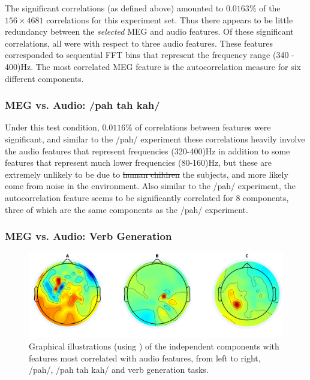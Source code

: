 \documentclass[a4paper]{article}
\begin{document}
The significant correlations (as defined above) amounted to $0.0163$\% of the $156 \times 4681$ correlations for this experiment set. Thus there appears to be little redundancy between the \textit{selected} MEG and audio features. Of these significant correlations, all were with respect to three audio features. These features corresponded to sequential FFT bins that represent the frequency range (340 - 400)Hz. The most correlated MEG feature is the autocorrelation measure for six different components. 

\subsubsection{MEG vs. Audio: /pah tah kah/}

Under this test condition, $0.0116$\% of correlations between features were significant, and similar to the /pah/ experiment these correlations heavily involve the audio features that represent frequencies (320-400)Hz in addition to some features that represent much lower frequencies (80-160)Hz, but these are extremely unlikely to be due to \st{human children} the subjects, and more likely come from noise in the environment. Also similar to the /pah/ experiment, the autocorrelation feature seems to be significantly correlated for 8 components, three of which are the same components as the /pah/ experiment. 


\subsubsection{MEG vs. Audio: Verb Generation}

\begin{figure}[t]
  \centering
  \includegraphics[width=\linewidth]{AllComponents.png}
  \caption{Graphical illustrations (using \cite{Delorme04eeglab}) of the independent components with features most correlated with audio features, from left to right, /pah/, /pah tah kah/ and verb generation tasks.}
  \label{fig:components}
\end{figure}
\end{document}
